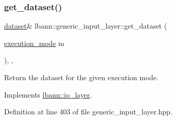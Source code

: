 \mbox{\label{classlbann_1_1generic__input__layer_af5699540797c22d8846028e578a6fc59}} 
\subsubsection{\texorpdfstring{get\+\_\+dataset()}{get\_dataset()}\hspace{0.1cm}{\footnotesize\ttfamily [1/2]}}
{\footnotesize\ttfamily \hyperlink{classlbann_1_1dataset}{dataset}\& lbann\+::generic\+\_\+input\+\_\+layer\+::get\+\_\+dataset (\begin{DoxyParamCaption}\item[{\hyperlink{base_8hpp_a2781a159088df64ed7d47cc91c4dc0a8}{execution\+\_\+mode}}]{m }\end{DoxyParamCaption})\hspace{0.3cm}{\ttfamily [inline]}, {\ttfamily [override]}, {\ttfamily [virtual]}}

Return the dataset for the given execution mode. 

Implements \hyperlink{classlbann_1_1io__layer_a027122c10603ede2ab9be779bad135f8}{lbann\+::io\+\_\+layer}.



Definition at line 403 of file generic\+\_\+input\+\_\+layer.\+hpp.


